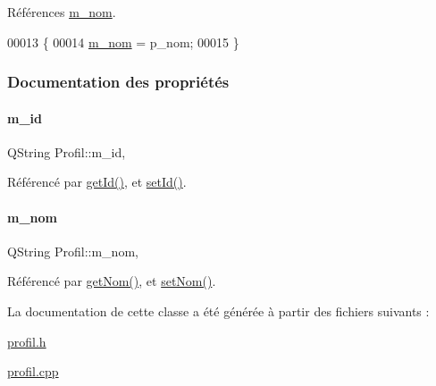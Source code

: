 Références \hyperlink{class_profil_a5159c0fa27b964d20813a51a56cab0dc}{m\+\_\+nom}.


\begin{DoxyCode}
00013 \{
00014     \hyperlink{class_profil_a5159c0fa27b964d20813a51a56cab0dc}{m\_nom} = p\_nom;
00015 \}
\end{DoxyCode}


\subsubsection{Documentation des propriétés}
\mbox{\label{class_profil_a181301ab1db188efb1e7c1574f6be917}} 
\paragraph{\texorpdfstring{m\+\_\+id}{m\_id}}
{\footnotesize\ttfamily Q\+String Profil\+::m\+\_\+id\hspace{0.3cm}{\ttfamily [read]}, {\ttfamily [write]}}



Référencé par \hyperlink{class_profil_ab6281942d5ebe10cb3b38589fc353ff6}{get\+Id()}, et \hyperlink{class_profil_a1b8f1741f5a201f50f6f8d6cb274c5c0}{set\+Id()}.

\mbox{\label{class_profil_a5159c0fa27b964d20813a51a56cab0dc}} 
\paragraph{\texorpdfstring{m\+\_\+nom}{m\_nom}}
{\footnotesize\ttfamily Q\+String Profil\+::m\+\_\+nom\hspace{0.3cm}{\ttfamily [read]}, {\ttfamily [write]}}



Référencé par \hyperlink{class_profil_aac46cc403319711f8ed5aef3fc1d0011}{get\+Nom()}, et \hyperlink{class_profil_a020bcb3d28350b10c58f86ab093719cd}{set\+Nom()}.



La documentation de cette classe a été générée à partir des fichiers suivants \+:\begin{DoxyCompactItemize}
\item 
\hyperlink{profil_8h}{profil.\+h}\item 
\hyperlink{profil_8cpp}{profil.\+cpp}\end{DoxyCompactItemize}
